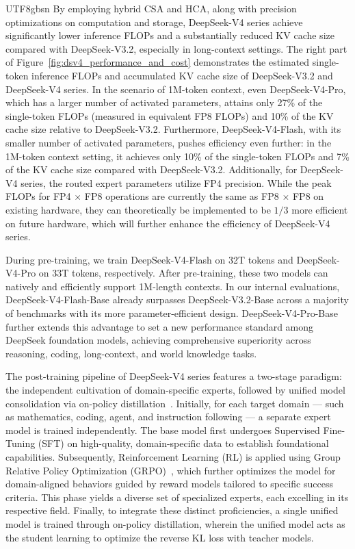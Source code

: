 \documentclass[11pt, a4paper, logo, copyright, nonumbering]{deepseek}
\newcommand{\dsviiiII}{DeepSeek-V3.2}
\newcommand{\dsviv}{DeepSeek-V4}
\newcommand{\dsvivp}{DeepSeek-V4-Pro}
\newcommand{\dsvivf}{DeepSeek-V4-Flash}
\newcommand{\dsvivptoken}{33T}
\newcommand{\dsvivftoken}{32T}
\newcommand{\hca}{HCA}
\newcommand{\csa}{CSA}
\begin{document}
\begin{CJK*}{UTF8}{gbsn}
By employing hybrid \csa{} and \hca{}, along with precision optimizations on computation and storage, \dsviv{} series achieve significantly lower inference FLOPs and a substantially reduced KV cache size compared with \dsviiiII{}, especially in long-context settings. 
The right part of Figure~\ref{fig:dsv4_performance_and_cost} demonstrates the estimated single-token inference FLOPs and accumulated KV cache size of \dsviiiII{} and \dsviv{} series.
In the scenario of 1M-token context, even \dsvivp{}, which has a larger number of activated parameters, attains only 27\% of the single-token FLOPs (measured in equivalent FP8 FLOPs) and 10\% of the KV cache size relative to \dsviiiII{}. 
Furthermore, \dsvivf{}, with its smaller number of activated parameters, pushes efficiency even further: in the 1M-token context setting, it achieves only 10\% of the single-token FLOPs and 7\% of the KV cache size compared with \dsviiiII{}. 
Additionally, for \dsviv{} series, the routed expert parameters utilize FP4 precision. 
While the peak FLOPs for FP4 $\times$ FP8 operations are currently the same as FP8 $\times$ FP8 on existing hardware, they can theoretically be implemented to be $1/3$ more efficient on future hardware, which will further enhance the efficiency of \dsviv{} series.

During pre-training, we train \dsvivf{} on \dsvivftoken{} tokens and \dsvivp{} on \dsvivptoken{} tokens, respectively. 
After pre-training, these two models can natively and efficiently support 1M-length contexts. 
In our internal evaluations, \dsvivf{}-Base already surpasses \dsviiiII{}-Base across a majority of benchmarks with its more parameter-efficient design. 
\dsvivp{}-Base further extends this advantage to set a new performance standard among DeepSeek foundation models, achieving comprehensive superiority across reasoning, coding, long-context, and world knowledge tasks.

The post-training pipeline of \dsviv{} series features a two-stage paradigm: the independent cultivation of domain-specific experts, followed by unified model consolidation via on-policy distillation~\citep{lu2025onpolicydistillation,minillm}. 
Initially, for each target domain --- such as mathematics, coding, agent, and instruction following --- a separate expert model is trained independently. 
The base model first undergoes Supervised Fine-Tuning (SFT) on high-quality, domain-specific data to establish foundational capabilities. 
Subsequently, Reinforcement Learning (RL) is applied using Group Relative Policy Optimization (GRPO)~\citep{dsr1}, which further optimizes the model for domain-aligned behaviors guided by reward models tailored to specific success criteria. 
This phase yields a diverse set of specialized experts, each excelling in its respective field. 
Finally, to integrate these distinct proficiencies, a single unified model is trained through on-policy distillation, wherein the unified model acts as the student learning to optimize the reverse KL loss with teacher models.


\end{CJK*}
\end{document}
